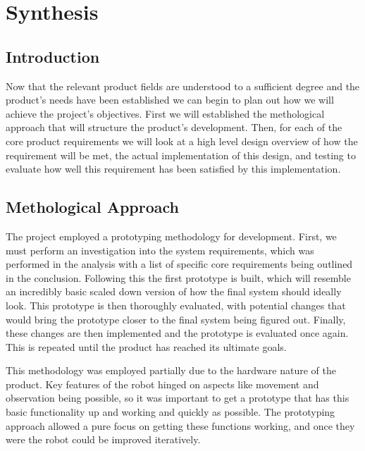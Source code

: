 \part{Synthesis}
	\chapter{Introduction}
	Now that the relevant product fields are understood to a sufficient degree and the product's needs have been established we can begin to plan out how we will achieve the project's objectives. First we will established the methological approach that will structure the product's development. Then, for each of the core product requirements we will look at a high level design overview of how the requirement will be met, the actual implementation of this design, and testing to evaluate how well this requirement has been satisfied by this implementation.
	
	\chapter{Methological Approach}
	The project employed a prototyping methodology for development. First, we must perform an investigation into the system requirements, which was performed in the analysis with a list of specific core requirements being outlined in the conclusion. Following this the first prototype is built, which will resemble an incredibly basic scaled down version of how the final system should ideally look. This prototype is then thoroughly evaluated, with potential changes that would bring the prototype closer to the final system being figured out. Finally, these changes are then implemented and the prototype is evaluated once again. This is repeated until the product has reached its ultimate goals.
	
	
	This methodology was employed partially due to the hardware nature of the product. Key features of the robot hinged on aspects like movement and observation being possible, so it was important to get a prototype that has this basic functionality up and working and quickly as possible. The prototyping approach allowed a pure focus on getting these functions working, and once they were the robot could be improved iteratively.
	
